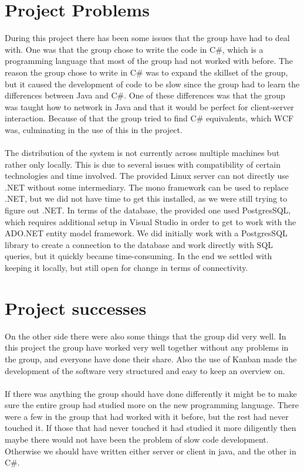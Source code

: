 	\section{Project Problems}
	During this project there has been some issues that the group have had to
   deal with. One was that the group chose to write the code in C\#, which is
    a programming language that most of the group had not worked with before.
    The reason the group chose to write in C\# was to expand the skillset of
     the group, but it caused the development of code to be slow since the
     group had to learn the differences between Java and C\#. One of these
      differences was that the group was taught how to network in Java and
      that it would be perfect for client-server interaction. Because of that
      the group tried to find C\# equivalents, which WCF was, culminating in
       the use of this in the project.
	\\
	\\
	The distribution of the system is not currently across multiple machines but
   rather only locally. This is due to several issues with compatibility of
   certain technologies and time involved. The provided Linux server can not
    directly use .NET without some intermediary. The mono framework can be
    used to replace .NET, but we did not have time to get this installed, as
    we were still trying to figure out .NET. In terms of the database, the
     provided one used PostgresSQL, which requires additional setup in Visual
      Studio in order to get to work with the ADO.NET entity model framework.
       We did initially work with a PostgresSQL library to create a connection
       to the database and work directly with SQL queries, but it quickly
       became time-consuming. In the end we settled with keeping it locally,
        but still open for change in terms of connectivity.
	\\
	\section{Project successes}
	On the other side there were also some things that the group did very well.
   In this project the group have worked very well together without any
   problems in the group, and everyone have done their share. Also the use
    of Kanban made the development of the software very structured and easy
     to keep an overview on.
	\\
	\\
If there was anything the group should have done differently it might be to
 make sure the entire group had studied more on the new programming language.
  There were a few in the group that had worked with it before, but the rest
  had never touched it. If those that had never touched it had studied it more
   diligently then maybe there would not have been the problem of slow code
    development. Otherwise we should have written either server or client in
    java, and the other in C\#.
